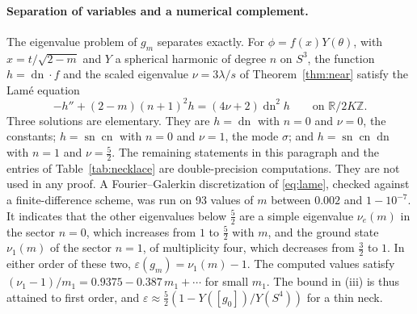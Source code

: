 \documentclass[11pt]{article}
\numberwithin{equation}{section}
\DeclareMathOperator{\sn}{sn}
\DeclareMathOperator{\cn}{cn}
\DeclareMathOperator{\dn}{dn}
\newcommand{\e}{\varepsilon}
\newcommand{\RR}{\mathbb{R}}
\newcommand{\Sphere}{S^4}
\begin{document}
\paragraph{Separation of variables and a numerical complement.}
The eigenvalue problem of \(g_m\) separates exactly. For
\(\phi=f(x)Y(\theta)\), with \(x=t/\sqrt{2-m}\) and \(Y\) a spherical
harmonic of degree \(n\) on \(S^3\), the function \(h=\dn\cdot f\) and
the scaled eigenvalue \(\nu=3\lambda/s\) of Theorem~\ref{thm:near}
satisfy the Lam\'e equation
\begin{equation}\label{eq:lame}
 -h''+(2-m)(n+1)^2h=(4\nu+2)\dn^2h\qquad\text{on }\RR/2K\mathbb Z .
\end{equation}
Three solutions are elementary. They are \(h=\dn\) with \(n=0\) and
\(\nu=0\), the constants; \(h=\sn\cn\) with \(n=0\) and \(\nu=1\), the
mode \(\sigma\); and \(h=\sn\cn\dn\) with \(n=1\) and
\(\nu=\tfrac52\). The remaining statements in this paragraph and the
entries of Table~\ref{tab:necklace} are double-precision computations.
They are not used in any proof. A Fourier--Galerkin discretization of
\eqref{eq:lame}, checked against a finite-difference scheme, was run on
93 values of \(m\) between \(0.002\) and \(1-10^{-7}\). It indicates
that the other eigenvalues below \(\tfrac52\) are a simple eigenvalue
\(\nu_e(m)\) in the sector \(n=0\), which increases from \(1\) to
\(\tfrac52\) with \(m\), and the ground state \(\nu_1(m)\) of the
sector \(n=1\), of multiplicity four, which decreases from
\(\tfrac32\) to \(1\). In either order of these two,
\(\e(g_m)=\nu_1(m)-1\). The computed values satisfy
\((\nu_1-1)/m_1=0.9375-0.387\,m_1+\cdots\) for small \(m_1\). The bound
in (iii) is thus attained to first order, and
\(\e\approx\tfrac52(1-Y([g_0])/Y(\Sphere))\) for a thin neck.
\end{document}
